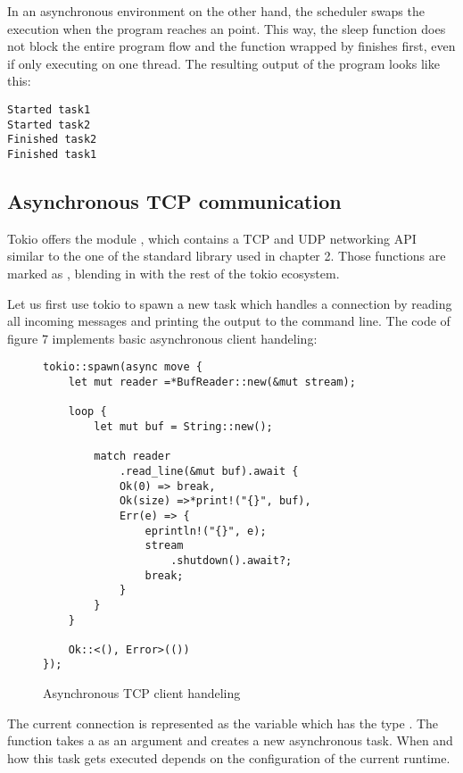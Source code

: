 In an asynchronous environment on the other hand, the scheduler swaps the execution when the program reaches an
 point. This way, the sleep function does not block the entire program flow and the function wrapped by
 finishes first, even if only executing on one thread. The resulting output of the program looks like
this:

\begin{verbatim}
Started task1
Started task2
Finished task2
Finished task1
\end{verbatim}

\subsection{Asynchronous TCP communication}
Tokio offers the module , which contains a TCP and UDP networking API similar to the one of the
standard library used in chapter 2. Those functions are marked as , blending in with the rest of the tokio
ecosystem.

Let us first use tokio to spawn a new task which handles a connection by reading all incoming messages and printing the
output to the command line. The code of figure 7 implements basic asynchronous client handeling:

\begin{figure}[ht]
    \begin{verbatim}
tokio::spawn(async move {
    let mut reader =*BufReader::new(&mut stream);

    loop {
        let mut buf = String::new();

        match reader
            .read_line(&mut buf).await {
            Ok(0) => break,
            Ok(size) =>*print!("{}", buf),
            Err(e) => {
                eprintln!("{}", e);
                stream
                    .shutdown().await?;
                break;
            }
        }
    }

    Ok::<(), Error>(())
});
    \end{verbatim}
    \caption{Asynchronous TCP client handeling}
\end{figure}

The current connection is represented as the variable  which has the type .
The function  takes a  as an argument and creates a new asynchronous task. When and how
this task gets executed depends on the configuration of the current runtime.

